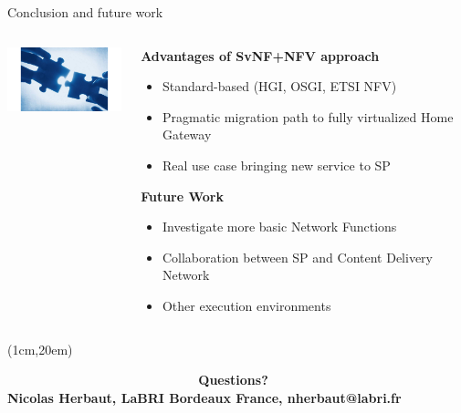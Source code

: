 \documentclass[a4paper]{beamer}
\begin{document}
\begin{frame}{Conclusion and future work}
	\begin{columns}[T]
		\begin{column}[T]{0.33 \textwidth} 
			\vspace{5em}
			\includegraphics[width=10em]{conclusion.jpg}
		\end{column}
										
		\begin{column}[T]{0.66\textwidth} 
										   
			\textbf{Advantages of SvNF+NFV approach}
			\begin{itemize}
				\item Standard-based (HGI, OSGI, ETSI NFV)
				\item Pragmatic migration path to fully virtualized Home Gateway
				\item Real use case bringing new service to SP
			\end{itemize}
			\vspace{3mm}
			\textbf{Future Work}
			\begin{itemize}
				\item Investigate more basic Network Functions
				\item Collaboration between SP and Content Delivery Network
				\item Other execution environments
			\end{itemize}
																																						
		\end{column}
																										
	\end{columns}
	
	
	
	
			\begin{textblock*}{11cm}(1cm,20em)
		\begin{block}
		
			\textbf{ ~~~~~~~~~~~~~~~~~~~~~~~~~~Questions? \\Nicolas Herbaut, LaBRI Bordeaux France, nherbaut@labri.fr}
			
		\end{block}
	\end{textblock*}	
	
\end{frame}
\end{document}
